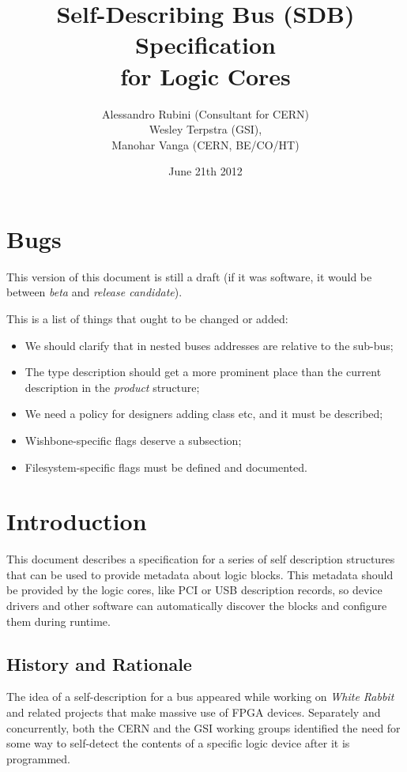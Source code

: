 \documentclass[a4paper, 12pt]{article}
\title{Self-Describing Bus (SDB) Specification\\
for Logic Cores}
\author{Alessandro Rubini (Consultant for CERN)\\
Wesley Terpstra (GSI),\\
Manohar Vanga (CERN, BE/CO/HT)}
\date{June 21th 2012}
\begin{document}
\maketitle

\tableofcontents
\listoftables

\pagebreak

\section*{Bugs}

This version of this document is still a draft (if it was software, it would be
between \textit{beta} and \textit{release candidate}).

This is a list of things that ought to be changed or added:

\begin{itemize}
\item We should clarify that in nested buses addresses are relative to the sub-bus;
\item The type description should get a more prominent place than the
  current description in the \textit{product} structure;
\item We need a policy for designers adding class etc, and it must be described;
\item Wishbone-specific flags deserve a subsection;
\item Filesystem-specific flags must be defined and documented.
\end{itemize}


\section{Introduction}

This document describes a specification for a series of self description
structures that can be used to provide metadata about logic blocks. This metadata
should be provided by the logic cores, like PCI or USB description records,
so device drivers and other software can automatically discover the blocks and
configure them during runtime.

\subsection{History and Rationale}

The idea of a self-description for a  bus appeared while working on
\textit{White Rabbit} and related projects that make massive use of
FPGA devices. Separately and concurrently, both the CERN and the GSI
working groups identified the need for some way to self-detect the
contents of a specific logic device after it is programmed.
\end{document}
